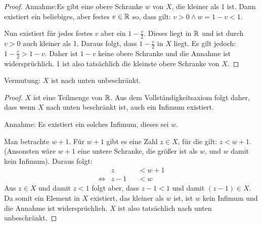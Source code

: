 \begin{lsg}
\begin{enumerate}[label=$\mathrm{(\roman*)}$, ref=$\mathrm{\roman*}$]
\begin{proof}
Annahme:Es gibt eine obere Schranke $w$ von $X$, die kleiner als 1 ist. Dann existiert ein beliebiges, aber festes $v\in \mathbb{R}$ so, dass gilt: $v>0 \land w=1-v<1$. 

Nun existiert für jedes festes $v$ aber ein $1-\frac{v}{2}$. Dieses liegt in $\mathbb{R}$ und ist durch $v>0$ auch kleiner als 1. Daraus folgt, dass $1-\frac{v}{2}$ in $X$ liegt. Es gilt jedoch: $1-\frac{v}{2}>1-v$. Daher ist $1-v$ keine obere Schranke und die Annahme ist widersprüchlich. 1 ist also tatsächlich die kleinste obere Schranke von $X$.
\end{proof}

Vermutung: $X$ ist nach unten unbeschränkt.
\begin{proof}
$X$ ist eine Teilmenge von $\mathbb{R}$. Aus dem Vollständigkeitsaxiom folgt daher, dass wenn $X$ nach unten beschränkt ist, auch ein Infimum existiert. 

Annahme: Es existiert ein solches Infimum, dieses sei $w$.

Man betrachte $w+1$. Für $w+1$ gibt es eine Zahl $z \in X$, für die gilt: $z<w+1$. (Ansonsten wäre $w+1$ eine untere Schranke, die größer ist als $w$, und $w$ damit kein Infimum). Daraus folgt:
\begin{align*}
&z&&<w+1 \\
\iff &z-1&&<w
\end{align*} 
Aus $z\in X$ und damit $z<1$ folgt aber, dass $z-1<1$ und damit $(z-1) \in X$. Da somit ein Element in $X$ existiert, das kleiner als $w$ ist, ist $w$ kein Infimum und die Annahme ist widersprüchlich. $X$ ist also tatsächlich nach unten unbeschränkt.
\end{proof}
\end{enumerate}
\end{lsg}


